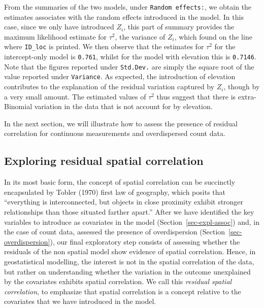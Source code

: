 \documentclass[
  letterpaper,
]{krantz}
\begin{document}
From the summaries of the two models, under \texttt{Random\ effects:},
we obtain the estimates associates with the random effects introduced in
the model. In this case, since we only have introduced \(Z_i\), this
part of summary provides the maximum likelihood estimate for \(\tau^2\),
the variance of \(Z_i\), which found on the line where \texttt{ID\_loc}
is printed. We then observe that the estimates for \(\tau^2\) for the
intercept-only model is \texttt{0.761}, whilst for the model with
elevation this is \texttt{0.7146}. Note that the figures reported under
\texttt{Std.Dev.} are simply the square root of the value reported under
\texttt{Variance}. As expected, the introduction of elevation
contributes to the explanation of the residual variation captured by
\(Z_i\), though by a very small amount. The estimated values of
\(\tau^2\) thus suggest that there is extra-Binomial variation in the
data that is not account for by elevation.

In the next section, we will illustrate how to assess the presence of
residual correlation for continuous measurements and overdispersed count
data.

\subsection{Exploring residual spatial
correlation}\label{sec-expl-spatial}

In its most basic form, the concept of spatial correlation can be
succinctly encapsulated by Tobler (1970) first law of geography, which
posits that ``everything is interconnected, but objects in close
proximity exhibit stronger relationships than those situated farther
apart.'' After we have identified the key variables to introduce as
covariates in the model (Section~\ref{sec-expl-assoc}) and, in the case
of count data, assessed the presence of overdispersion
(Section~\ref{sec-overdispersion}), our final exploratory step consists
of assessing whether the residuals of the non spatial model show
evidence of spatial correlation. Hence, in geostatistical modelling, the
interest is not in the spatial correlation of the data, but rather on
understanding whether the variation in the outcome unexplained by the
covariates exhibits spatial correlation. We call this \emph{residual
spatial correlation}, to emphasize that spatial correlation is a concept
relative to the covariates that we have introduced in the model.
\end{document}
